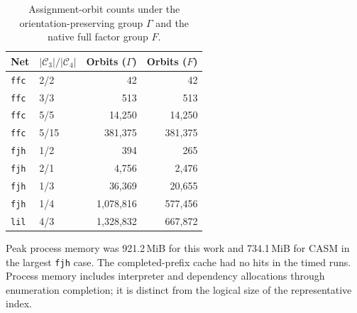 \documentclass[a5paper, 10pt]{article}
\begin{document}
\begin{table}[H]
\centering\scriptsize
\setlength{\tabcolsep}{1.2mm}
\caption{Assignment-orbit counts under the orientation-preserving group $\Gamma$ and the native full factor group $F$.}
\label{tab:orbit_group_counts}
\begin{tabular}{llrr}
\toprule
Net & $|\mathcal C_3|/|\mathcal C_4|$ & Orbits ($\Gamma$) & Orbits ($F$) \\
\midrule
\texttt{ffc} & 2/2 & 42 & 42 \\
\texttt{ffc} & 3/3 & 513 & 513 \\
\texttt{ffc} & 5/5 & 14,250 & 14,250 \\
\texttt{ffc} & 5/15 & 381,375 & 381,375 \\
\texttt{fjh} & 1/2 & 394 & 265 \\
\texttt{fjh} & 2/1 & 4,756 & 2,476 \\
\texttt{fjh} & 1/3 & 36,369 & 20,655 \\
\texttt{fjh} & 1/4 & 1,078,816 & 577,456 \\
\texttt{lil} & 4/3 & 1,328,832 & 667,872 \\
\bottomrule
\end{tabular}
\end{table}

Peak process memory was 921.2\,MiB for this work and 734.1\,MiB for CASM in the largest \texttt{fjh} case. The completed-prefix cache had no hits in the timed runs. Process memory includes interpreter and dependency allocations through enumeration completion; it is distinct from the logical size of the representative index.
\end{document}
